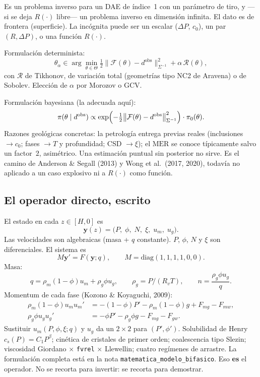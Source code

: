 \documentclass[11pt,a4paper]{article}
\theoremstyle{plain}
\theoremstyle{definition}
\theoremstyle{remark}
\newcommand{\MER}{\mathrm{MER}}
\newcommand{\Rv}{R_v}
\newcommand{\F}{\mathcal{F}}
\begin{document}
Es un problema inverso para un DAE de índice~1 con un parámetro de
tiro, y ---si se deja $R(\cdot)$ libre--- un problema inverso en
dimensión infinita. El dato es de frontera (superficie). La
incógnita puede ser un escalar ($\Delta P$, $c_0$), un par
$(R,\Delta P)$, o una función $R(\cdot)$.

Formulación determinista:
\begin{equation}
\label{eq:tikhonov}
\theta_\alpha\in\arg\min_{\theta\in\Theta}
\tfrac12\bigl\|\F(\theta)-d^{\mathrm{obs}}\bigr\|_{\Sigma^{-1}}^2
+\alpha\,\mathcal{R}(\theta),
\end{equation}
con $\mathcal{R}$ de Tikhonov, de variación total (geometrías tipo
NC2 de Aravena) o de Sobolev. Elección de $\alpha$ por Morozov o
GCV.

Formulación bayesiana (la adecuada aquí):
\begin{equation}
\label{eq:bayes}
\pi(\theta\mid d^{\mathrm{obs}})
\propto
\exp\Bigl(-\tfrac12\bigl\|\F(\theta)-d^{\mathrm{obs}}\bigr\|_{\Sigma^{-1}}^2\Bigr)
\cdot\pi_0(\theta).
\end{equation}
Razones geológicas concretas: la petrología entrega previas reales
(inclusiones $\to c_0$; fases $\to T$ y profundidad; CSD $\to\xi$);
el $\MER$ se conoce típicamente salvo un factor~$2$, asimétrico.
Una estimación puntual sin posterior no sirve. Es el camino de
Anderson \& Segall (2013) y Wong et al.\ (2017, 2020), todavía no
aplicado a un caso explosivo ni a $R(\cdot)$ como función.

\subsection{El operador directo, escrito}

El estado en cada $z\in[H,0]$ es
\begin{equation}
\mathbf{y}(z)=\bigl(P,\;\phi,\;N,\;\xi,\;u_m,\;u_g\bigr).
\end{equation}
Las velocidades son algebraicas (masa + $q$ constante). $P$,
$\phi$, $N$ y $\xi$ son diferenciales. El sistema es
\begin{equation}
M\mathbf{y}'=F(\mathbf{y};q),\qquad
M=\mathrm{diag}(1,1,1,1,0,0).
\end{equation}
Masa:
\begin{equation}
q=\rho_m(1-\phi)u_m+\rho_g\phi u_g,\qquad
\rho_g=P/(\Rv T),\qquad
n=\frac{\rho_g\phi u_g}{q}.
\end{equation}
Momentum de cada fase (Kozono \& Koyaguchi, 2009):
\begin{align}
\rho_m(1-\phi)u_m u_m'
&=-(1-\phi)P'-\rho_m(1-\phi)g+F_{mg}-F_{mw},\\
\rho_g\phi u_g u_g'
&=-\phi P'-\rho_g\phi g-F_{mg}-F_{gw}.
\end{align}
Sustituir $u_m(P,\phi,\xi;q)$ y $u_g$ da un $2\times 2$ para
$(P',\phi')$. Solubilidad de Henry $c_s(P)=C_1 P^\beta$; cinética
de cristales de primer orden; coalescencia tipo Slezin; viscosidad
Giordano $\times$ \texttt{fvrel} $\times$ Llewellin; cuatro
regímenes de arrastre. La formulación completa está en
la nota \texttt{matematica\_modelo\_bifasico}. Eso \textbf{es}
el operador. No se recorta para invertir: se recorta para
demostrar.
\end{document}
